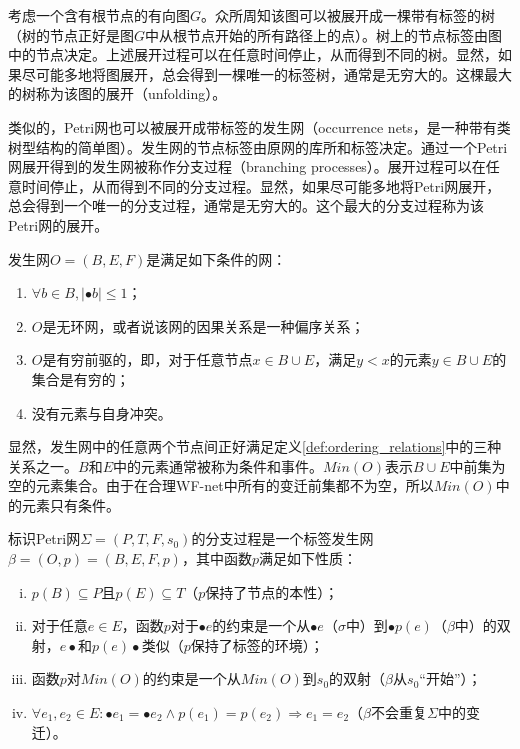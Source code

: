 考虑一个含有根节点的有向图$G$。众所周知该图可以被展开成一棵带有标签的树（树的节点正好是图$G$中从根节点开始的所有路径上的点）。树上的节点标签由图中的节点决定。上述展开过程可以在任意时间停止，从而得到不同的树。显然，如果尽可能多地将图展开，总会得到一棵唯一的标签树，通常是无穷大的。这棵最大的树称为该图的展开（unfolding）。

类似的，Petri网也可以被展开成带标签的发生网（occurrence nets，是一种带有类树型结构的简单图）。发生网的节点标签由原网的库所和标签决定。通过一个Petri网展开得到的发生网被称作分支过程（branching processes）。展开过程可以在任意时间停止，从而得到不同的分支过程。显然，如果尽可能多地将Petri网展开，总会得到一个唯一的分支过程，通常是无穷大的。这个最大的分支过程称为该Petri网的展开。

\begin{definition}[发生网]\label{def:occurrence_net}
发生网$O=(B,E,F)$是满足如下条件的网：
  \begin{enumerate}[(1)]
  	\item $\forall b\in B,|\bullet b|\leq 1$；
  	\item $O$是无环网，或者说该网的因果关系是一种偏序关系；
  	\item $O$是有穷前驱的，即，对于任意节点$x\in B\cup E$，满足$y<x$的元素$y\in B\cup E$的集合是有穷的；
  	\item 没有元素与自身冲突。
  \end{enumerate}
\end{definition}

显然，发生网中的任意两个节点间正好满足定义\ref{def:ordering_relations}中的三种关系之一。$B$和$E$中的元素通常被称为条件和事件。$Min(O)$表示$B\cup E$中前集为空的元素集合。由于在合理WF-net中所有的变迁前集都不为空，所以$Min(O)$中的元素只有条件。

\begin{definition}[分支过程]\label{def:branching_process}
标识Petri网$\Sigma=(P,T,F,s_{0})$的分支过程是一个标签发生网$\beta=(O,p)=(B,E,F,p)$，其中函数$p$满足如下性质：
  \begin{enumerate}[(i)]
  	\item $p(B)\subseteq P$且$p(E)\subseteq T$（$p$保持了节点的本性）；
  	\item 对于任意$e\in E$，函数$p$对于$\bullet e$的约束是一个从$\bullet e$（$\sigma$中）到$\bullet p(e)$（$\beta$中）的双射，$e\bullet$和$p(e)\bullet$类似（$p$保持了标签的环境）；
  	\item 函数$p$对$Min(O)$的约束是一个从$Min(O)$到$s_{0}$的双射（$\beta$从$s_{0}$“开始”）；
  	\item $\forall e_{1},e_{2}\in E:\bullet e_{1}=\bullet e_{2}\wedge p(e_{1})=p(e_{2})\Rightarrow e_{1}=e_{2}$（$\beta$不会重复$\Sigma$中的变迁）。
  \end{enumerate}
\end{definition}

